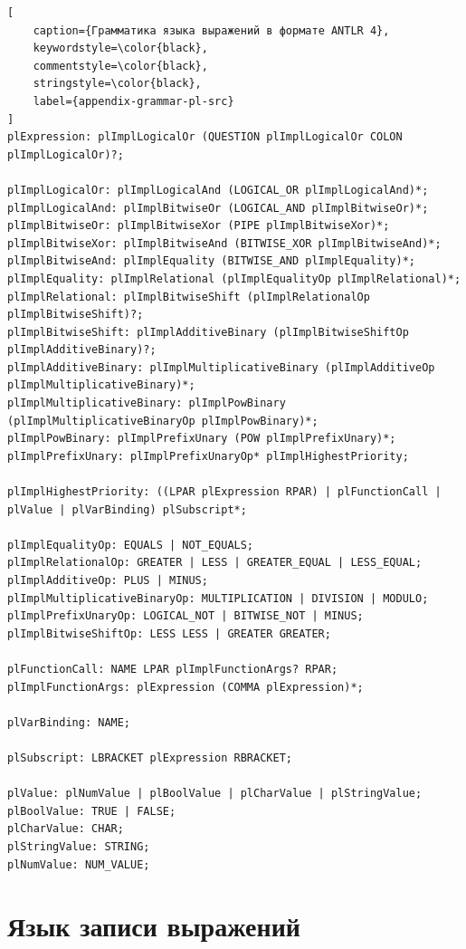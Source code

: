 \documentclass[times,specification,annotation]{style/itmo-student-thesis/itmo-student-thesis}
\begin{document}
\begin{lstlisting}[
    caption={Грамматика языка выражений в формате ANTLR 4},
    keywordstyle=\color{black},
    commentstyle=\color{black},
    stringstyle=\color{black},
    label={appendix-grammar-pl-src}
]
plExpression: plImplLogicalOr (QUESTION plImplLogicalOr COLON plImplLogicalOr)?;

plImplLogicalOr: plImplLogicalAnd (LOGICAL_OR plImplLogicalAnd)*;
plImplLogicalAnd: plImplBitwiseOr (LOGICAL_AND plImplBitwiseOr)*;
plImplBitwiseOr: plImplBitwiseXor (PIPE plImplBitwiseXor)*;
plImplBitwiseXor: plImplBitwiseAnd (BITWISE_XOR plImplBitwiseAnd)*;
plImplBitwiseAnd: plImplEquality (BITWISE_AND plImplEquality)*;
plImplEquality: plImplRelational (plImplEqualityOp plImplRelational)*;
plImplRelational: plImplBitwiseShift (plImplRelationalOp plImplBitwiseShift)?;
plImplBitwiseShift: plImplAdditiveBinary (plImplBitwiseShiftOp plImplAdditiveBinary)?;
plImplAdditiveBinary: plImplMultiplicativeBinary (plImplAdditiveOp plImplMultiplicativeBinary)*;
plImplMultiplicativeBinary: plImplPowBinary (plImplMultiplicativeBinaryOp plImplPowBinary)*;
plImplPowBinary: plImplPrefixUnary (POW plImplPrefixUnary)*;
plImplPrefixUnary: plImplPrefixUnaryOp* plImplHighestPriority;

plImplHighestPriority: ((LPAR plExpression RPAR) | plFunctionCall | plValue | plVarBinding) plSubscript*;

plImplEqualityOp: EQUALS | NOT_EQUALS;
plImplRelationalOp: GREATER | LESS | GREATER_EQUAL | LESS_EQUAL;
plImplAdditiveOp: PLUS | MINUS;
plImplMultiplicativeBinaryOp: MULTIPLICATION | DIVISION | MODULO;
plImplPrefixUnaryOp: LOGICAL_NOT | BITWISE_NOT | MINUS;
plImplBitwiseShiftOp: LESS LESS | GREATER GREATER;

plFunctionCall: NAME LPAR plImplFunctionArgs? RPAR;
plImplFunctionArgs: plExpression (COMMA plExpression)*;

plVarBinding: NAME;

plSubscript: LBRACKET plExpression RBRACKET;

plValue: plNumValue | plBoolValue | plCharValue | plStringValue;
plBoolValue: TRUE | FALSE;
plCharValue: CHAR;
plStringValue: STRING;
plNumValue: NUM_VALUE;
\end{lstlisting}

\chapter{Язык записи выражений}\label{appendix-pl-operators-priority}
\end{document}
